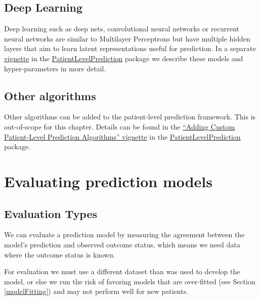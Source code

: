 \documentclass[11pt]{book}
\theoremstyle{definition}
\theoremstyle{definition}
\theoremstyle{definition}
\theoremstyle{remark}
\let\BeginKnitrBlock\begin \let\EndKnitrBlock\end
\begin{document}
\hypertarget{deep-learning}{%
\subsection{Deep Learning}\label{deep-learning}}

Deep learning such as deep nets, convolutional neural networks or recurrent neural networks are similar to Multilayer Perceptrons but have multiple hidden layers that aim to learn latent representations useful for prediction. In a separate \href{https://ohdsi.github.io/PatientLevelPrediction/articles/BuildingDeepLearningModels.html}{vignette} in the \href{https://ohdsi.github.io/PatientLevelPrediction/}{PatientLevelPrediction} package we describe these models and hyper-parameters in more detail.   

\hypertarget{other-algorithms}{%
\subsection{Other algorithms}\label{other-algorithms}}

Other algorithms can be added to the patient-level prediction framework. This is out-of-scope for this chapter. Details can be found in the \href{https://ohdsi.github.io/PatientLevelPrediction/articles/AddingCustomAlgorithms.html}{``Adding Custom Patient-Level Prediction Algorithms'' vignette} in the \href{https://ohdsi.github.io/PatientLevelPrediction/}{PatientLevelPrediction} package.

\hypertarget{evaluating-prediction-models}{%
\section{Evaluating prediction models}\label{evaluating-prediction-models}}

\hypertarget{evaluation-types}{%
\subsection{Evaluation Types}\label{evaluation-types}}

We can evaluate a prediction model by measuring the agreement between the model's prediction and observed outcome status, which means we need data where the outcome status is known. 

\BeginKnitrBlock{rmdimportant}
For evaluation we must use a different dataset than was used to develop the model, or else we run the risk of favoring models that are over-fitted (see Section \ref{modelFitting}) and may not perform well for new patients.
\EndKnitrBlock{rmdimportant}
\end{document}
